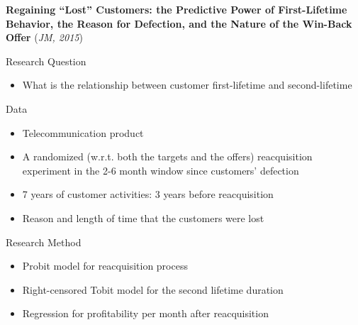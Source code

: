 \documentclass[aspectratio=169]{beamer}  %
\begin{document}
\begin{frame}{\textbf{Regaining ``Lost'' Customers: the Predictive Power of First-Lifetime Behavior, the Reason for Defection, and the Nature of the Win-Back Offer} (\textit{JM, 2015})}

Research Question
\begin{itemize}
    \item What is the relationship between customer first-lifetime and second-lifetime
\end{itemize}
Data
\begin{itemize}
    \item Telecommunication product
    \item A randomized (w.r.t. both the targets and the offers) reacquisition experiment in the 2-6 month window since customers' defection 
    \item 7 years of customer activities: 3 years before reacquisition
    \item Reason and length of time that the customers were lost
\end{itemize}
Research Method
\begin{itemize}
    \item Probit model for reacquisition process
    \item Right-censored Tobit model for the second lifetime duration
    \item Regression for profitability per month after reacquisition
    
\end{itemize}
\end{frame}
\end{document}
